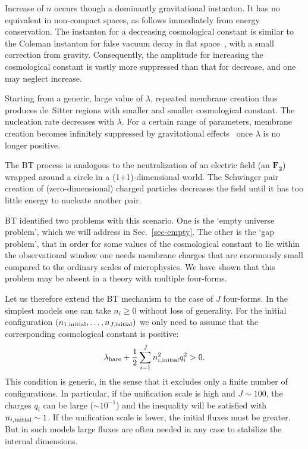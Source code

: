 \documentclass[12pt]{article}
\begin{document}
Increase of $n$ occurs though a dominantly gravitational instanton.
It has no equivalent in non-compact spaces, as follows immediately
from energy conservation.  The instanton for a decreasing cosmological
constant is similar to the Coleman instanton for false vacuum decay in
flat space~\cite{Col77}, with a small correction from gravity.
Consequently, the amplitude for increasing the cosmological constant
is vastly more suppressed than that for decrease, and one may neglect
increase.

Starting from a generic, large value of $\lambda$, repeated membrane
creation thus produces de~Sitter regions with smaller and smaller
cosmological constant.  The nucleation rate decreases with $\lambda$.
For a certain range of parameters, membrane creation becomes
infinitely suppressed by gravitational effects~\cite{ColDel80} once
$\lambda$ is no longer positive.

The BT process is analogous to the neutralization of an electric field
(an $\mathbf{F_2}$) wrapped around a circle in a (1+1)-dimensional
world.  The Schwinger pair creation of (zero-dimensional) charged
particles decreases the field until it has too little energy to
nucleate another pair.

BT identified two problems with this scenario.  One is the `empty
universe problem', which we will address in Sec.~\ref{sec-empty}.
The other is the `gap problem', that in order for some values of the
cosmological constant to lie within the observational window one needs
membrane charges that are enormously small compared to the ordinary
scales of microphysics.  We have shown that this problem may be absent
in a theory with multiple four-forms.

Let us therefore extend the BT mechanism to the case of $J$
four-forms.  In the simplest models one can take $n_i \geq 0$ without
loss of generality.  For the initial configuration
$(n_{1,\rm{initial}}, \ldots, n_{J,\rm{initial}})$ we only need to
assume that the corresponding cosmological constant is positive:
\begin{equation}
\lambda_{\rm bare} + \frac{1}{2} \sum_{i=1}^J
n_{i,\rm{initial}}^2 q_i^2 > 0.
\end{equation}
This condition is generic, in the sense that it excludes only a finite
number of configurations.  In particular, if the unification scale is
high and $J \sim 100$, the charges $q_i$ can be large ($\sim 10^{-1}$)
and the inequality will be satisfied with $n_{i,\rm{initial}} \sim
1$.  If the unification scale is lower, the initial fluxes must be
greater.  But in such models large fluxes are often needed in any case
to stabilize the internal dimensions.
\end{document}
